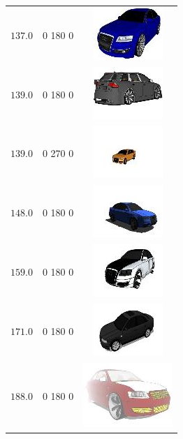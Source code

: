 \begin{longtable}{ccc}
	$137.0$ & 0 180 0 & \includegraphics{models/efade459a90b2b143337cb9d908ce86e.jpg}\\
	$139.0$ & 0 180 0 & \includegraphics{models/8c9a1519f70fa82bd8772618b7452025.jpg}\\
	$139.0$ & 0 270 0 & \includegraphics{models/e9f245ab6f4940c82b7c00d180204098.jpg}\\
	$148.0$ & 0 180 0 & \includegraphics{models/f6579b7fd92b7059d38fce76e7a54a13.jpg}\\
	$159.0$ & 0 180 0 & \includegraphics{models/8280b8d35355bbd56204845b7cb50f20.jpg}\\
	$171.0$ & 0 180 0 & \includegraphics{models/7bf6249a031b5095ddd41159baaa3ad5.jpg}\\
	$188.0$ & 0 180 0 & \includegraphics{models/4bee47e5d1fb6450dba755dfef103652.jpg}\\

\end{longtable}

